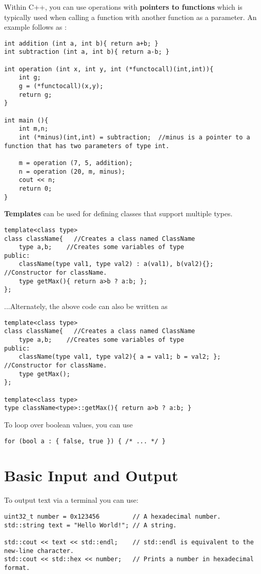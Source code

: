 Within C++, you can use operations with \textbf{pointers to functions} which is typically used when calling a function with another function as a parameter. An example follows as \cite{cpp:pointers}:
\begin{lstlisting}
int addition (int a, int b){ return a+b; }
int subtraction (int a, int b){ return a-b; }

int operation (int x, int y, int (*functocall)(int,int)){
	int g;
	g = (*functocall)(x,y);
	return g;
}

int main (){
	int m,n;
	int (*minus)(int,int) = subtraction;  //minus is a pointer to a function that has two parameters of type int.
	
	m = operation (7, 5, addition);
	n = operation (20, m, minus);
	cout << n;
	return 0;
}
\end{lstlisting}

\textbf{Templates} can be used for defining classes that support multiple types. 
\begin{lstlisting}
template<class type>
class className{   //Creates a class named ClassName
	type a,b;    //Creates some variables of type
public:
	className(type val1, type val2) : a(val1), b(val2){};  //Constructor for className.
	type getMax(){ return a>b ? a:b; };
};
\end{lstlisting}
...Alternately, the above code can also be written as
\begin{lstlisting}
template<class type>
class className{   //Creates a class named ClassName
	type a,b;    //Creates some variables of type
public:
	className(type val1, type val2){ a = val1; b = val2; };  //Constructor for className.
	type getMax();
};

template<class type>
type className<type>::getMax(){ return a>b ? a:b; }
\end{lstlisting}

To loop over boolean values, you can use
\begin{lstlisting}
for (bool a : { false, true }) { /* ... */ }
\end{lstlisting}



\section{Basic Input and Output}
To output text via a terminal you can use:
\begin{lstlisting}
uint32_t number = 0x123456         // A hexadecimal number.
std::string text = "Hello World!"; // A string.

std::cout << text << std::endl;    // std::endl is equivalent to the new-line character.
std::cout << std::hex << number;   // Prints a number in hexadecimal format.
\end{lstlisting}

